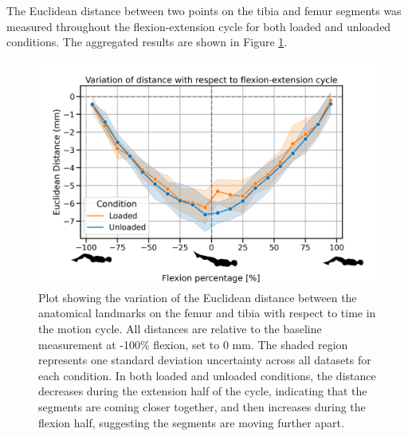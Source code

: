 \documentclass{micro-econ-thesis}
\begin{document}
The Euclidean distance between two points on the tibia and femur segments was measured throughout the flexion-extension cycle for both loaded and unloaded conditions. The aggregated results are shown in Figure \ref{fig:resultsdistancestickman}.
\begin{figure}[H]
	\centering
	\includegraphics[width=0.7\linewidth]{distance_no_13_stick}
	\caption{Plot showing the variation of the Euclidean distance between the anatomical landmarks on the femur and tibia with respect to time in the motion cycle. All distances are relative to the baseline measurement at -100\% flexion, set to 0 mm. The shaded region represents one standard deviation uncertainty across all datasets for each condition. In both loaded and unloaded conditions, the distance decreases during the extension half of the cycle, indicating that the segments are coming closer together, and then increases during the flexion half, suggesting the segments are moving further apart.}
	\label{fig:resultsdistancestickman}
\end{figure}
\end{document}
